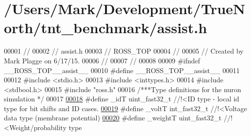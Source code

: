 \hypertarget{assist_8h_source}{}\section{/\+Users/\+Mark/\+Development/\+True\+North/tnt\+\_\+benchmark/assist.h}

\begin{DoxyCode}
00001 \textcolor{comment}{//}
00002 \textcolor{comment}{//  assist.h}
00003 \textcolor{comment}{//  ROSS\_TOP}
00004 \textcolor{comment}{//}
00005 \textcolor{comment}{//  Created by Mark Plagge on 6/17/15.}
00006 \textcolor{comment}{//}
00007 \textcolor{comment}{//}
00008 
00009 \textcolor{preprocessor}{#}\textcolor{preprocessor}{ifndef} \textcolor{preprocessor}{\_\_ROSS\_TOP\_\_assist\_\_}
00010 \textcolor{preprocessor}{#}\textcolor{preprocessor}{define} \textcolor{preprocessor}{\_\_ROSS\_TOP\_\_assist\_\_}
00011 
00012 \textcolor{preprocessor}{#}\textcolor{preprocessor}{include} \textcolor{preprocessor}{<}\textcolor{preprocessor}{stdio}\textcolor{preprocessor}{.}\textcolor{preprocessor}{h}\textcolor{preprocessor}{>}
00013 \textcolor{preprocessor}{#}\textcolor{preprocessor}{include} \textcolor{preprocessor}{<}\textcolor{preprocessor}{inttypes}\textcolor{preprocessor}{.}\textcolor{preprocessor}{h}\textcolor{preprocessor}{>}
00014 \textcolor{preprocessor}{#}\textcolor{preprocessor}{include} \textcolor{preprocessor}{<}\textcolor{preprocessor}{stdbool}\textcolor{preprocessor}{.}\textcolor{preprocessor}{h}\textcolor{preprocessor}{>}
00015 \textcolor{preprocessor}{#}\textcolor{preprocessor}{include} \textcolor{preprocessor}{"ross.h"}
00016 \textcolor{comment}{/***Type definitions for the nuron simulation */}
00017 
\hypertarget{assist_8h_source_l00018}{}\hyperlink{assist_8h_a3f7a6e6a1210b6d9d7a42177dcb9634b}{00018} \textcolor{preprocessor}{#}\textcolor{preprocessor}{define} \textcolor{preprocessor}{\_idT} \textcolor{preprocessor}{uint\_fast32\_t} \textcolor{comment}{//!<ID type - local id type for bit shifts and ID cases.}
\hypertarget{assist_8h_source_l00019}{}\hyperlink{assist_8h_abe1fc1b8f9efd1187e564bcb8de7f815}{00019} \textcolor{preprocessor}{#}\textcolor{preprocessor}{define} \textcolor{preprocessor}{\_voltT} \textcolor{preprocessor}{int\_fast32\_t} \textcolor{comment}{//!<Voltage data type (membrane potential)}
\hypertarget{assist_8h_source_l00020}{}\hyperlink{assist_8h_aa73c5ea0fe4ba938c96e6771b38dcb2a}{00020} \textcolor{preprocessor}{#}\textcolor{preprocessor}{define} \textcolor{preprocessor}{\_weightT} \textcolor{preprocessor}{uint\_fast32\_t} \textcolor{comment}{//!<Weight/probability type}

\end{DoxyCode}
